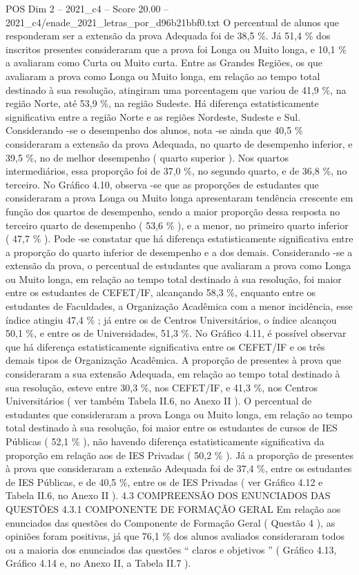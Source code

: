 \begin{textsample}{POS Dim 2 – 2021\_c4 – Score 20.00 – 2021\_c4/enade\_2021\_letras\_por\_d96b21bbf0.txt}
O percentual de alunos que responderam ser a extensão da prova Adequada foi de 38,5 \%.
Já 51,4 \% dos inscritos presentes consideraram que a prova foi Longa ou Muito longa, e 10,1 \% a avaliaram como Curta ou Muito curta.
Entre as Grandes Regiões, os que avaliaram a prova como Longa ou Muito longa, em relação ao tempo total destinado à sua resolução, atingiram uma porcentagem que variou de 41,9 \%, na região Norte, até 53,9 \%, na região Sudeste.
Há diferença estatisticamente significativa entre a região Norte e as regiões Nordeste, Sudeste e Sul.
Considerando -se o desempenho dos alunos, nota -se ainda que 40,5 \% consideraram a extensão da prova Adequada, no quarto de desempenho inferior, e 39,5 \%, no de melhor desempenho ( quarto superior ).
Nos quartos intermediários, essa proporção foi de 37,0 \%, no segundo quarto, e de 36,8 \%, no terceiro.
No Gráfico 4.10, observa -se que as proporções de estudantes que consideraram a prova Longa ou Muito longa apresentaram tendência crescente em função dos quartos de desempenho, sendo a maior proporção dessa resposta no terceiro quarto de desempenho ( 53,6 \% ), e a menor, no primeiro quarto inferior ( 47,7 \% ).
Pode -se constatar que há diferença estatisticamente significativa entre a proporção do quarto inferior de desempenho e a dos demais.
Considerando -se a extensão da prova, o percentual de estudantes que avaliaram a prova como Longa ou Muito longa, em relação ao tempo total destinado à sua resolução, foi maior entre os estudantes de CEFET/IF, alcançando 58,3 \%, enquanto entre os estudantes de Faculdades, a Organização Acadêmica com a menor incidência, esse índice atingiu 47,4 \% ; já entre os de Centros Universitários, o índice alcançou 50,1 \%, e entre os de Universidades, 51,3 \%.
No Gráfico 4.11, é possível observar que há diferença estatisticamente significativa entre os CEFET/IF e os três demais tipos de Organização Acadêmica.
A proporção de presentes à prova que consideraram a sua extensão Adequada, em relação ao tempo total destinado à sua resolução, esteve entre 30,3 \%, nos CEFET/IF, e 41,3 \%, nos Centros Universitários ( ver também Tabela II.6, no Anexo II ).
O percentual de estudantes que consideraram a prova Longa ou Muito longa, em relação ao tempo total destinado à sua resolução, foi maior entre os estudantes de cursos de IES Públicas ( 52,1 \% ), não havendo diferença estatisticamente significativa da proporção em relação aos de IES Privadas ( 50,2 \% ).
Já a proporção de presentes à prova que consideraram a extensão Adequada foi de 37,4 \%, entre os estudantes de IES Públicas, e de 40,5 \%, entre os de IES Privadas ( ver Gráfico 4.12 e Tabela II.6, no Anexo II ). 4.3 COMPREENSÃO DOS ENUNCIADOS DAS QUESTÕES 4.3.1 COMPONENTE DE FORMAÇÃO GERAL Em relação aos enunciados das questões do Componente de Formação Geral ( Questão 4 ), as opiniões foram positivas, já que 76,1 \% dos alunos avaliados consideraram todos ou a maioria dos enunciados das questões “ claros e objetivos ” ( Gráfico 4.13, Gráfico 4.14 e, no Anexo II, a Tabela II.7 ).

\end{textsample}

